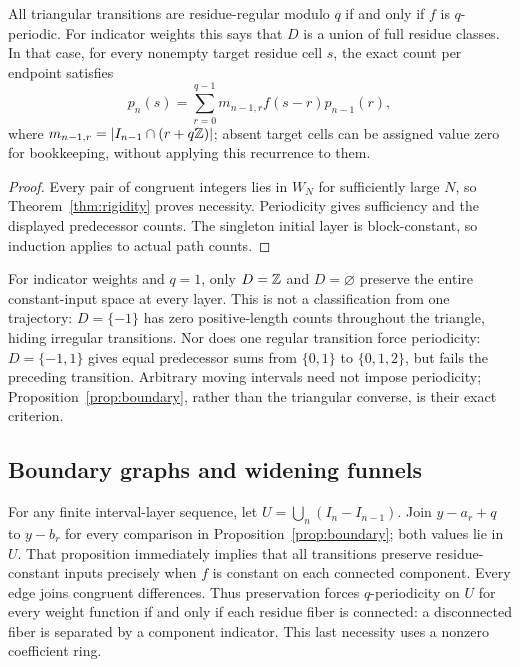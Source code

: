 \begin{proposition}\label{prop:periodic}
All triangular transitions are residue-regular modulo $q$ if and only if $f$ is $q$-periodic. For indicator weights this says that $D$ is a union of full residue classes. In that case, for every nonempty target residue cell $s$, the exact count per endpoint satisfies
\[
p_n(s)=\sum_{r=0}^{q-1}m_{n-1,r}f(s-r)p_{n-1}(r),
\]
where $m_{n-1,r}=|I_{n-1}\cap(r+q\mathbb Z)|$; absent target cells can be assigned value zero for bookkeeping, without applying this recurrence to them.
\end{proposition}
\begin{proof}
Every pair of congruent integers lies in $W_N$ for sufficiently large $N$, so Theorem~\ref{thm:rigidity} proves necessity. Periodicity gives sufficiency and the displayed predecessor counts. The singleton initial layer is block-constant, so induction applies to actual path counts.
\end{proof}
For indicator weights and $q=1$, only $D=\mathbb Z$ and $D=\varnothing$ preserve the entire constant-input space at every layer. This is not a classification from one trajectory: $D=\{-1\}$ has zero positive-length counts throughout the triangle, hiding irregular transitions. Nor does one regular transition force periodicity: $D=\{-1,1\}$ gives equal predecessor sums from $\{0,1\}$ to $\{0,1,2\}$, but fails the preceding transition. Arbitrary moving intervals need not impose periodicity; Proposition~\ref{prop:boundary}, rather than the triangular converse, is their exact criterion.

\subsection{Boundary graphs and widening funnels}
For any finite interval-layer sequence, let $U=\bigcup_n(I_n-I_{n-1})$. Join $y-a_r+q$ to $y-b_r$ for every comparison in Proposition~\ref{prop:boundary}; both values lie in $U$. That proposition immediately implies that all transitions preserve residue-constant inputs precisely when $f$ is constant on each connected component. Every edge joins congruent differences. Thus preservation forces $q$-periodicity on $U$ for every weight function if and only if each residue fiber is connected: a disconnected fiber is separated by a component indicator. This last necessity uses a nonzero coefficient ring.

